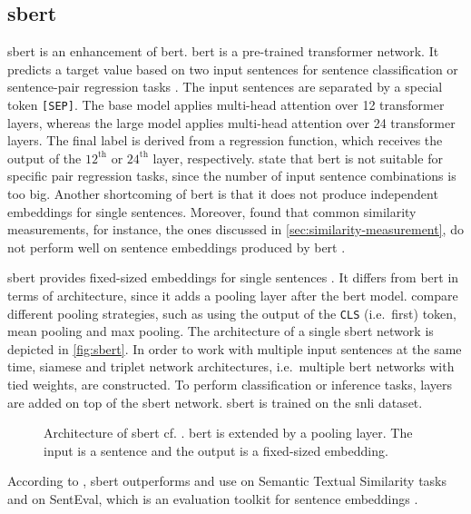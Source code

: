 \subsection{\acl*{sbert}}\label{subsec:hf-sent-ransformers}

\ac{sbert} is an enhancement of \ac{bert}.
\ac{bert} is a pre-trained transformer network.
It predicts a target value based on two input sentences for sentence classification or sentence-pair regression tasks \cite{HfsentTrans2019}.
The input sentences are separated by a special token \texttt{[SEP]}.
The base model applies multi-head attention over 12 transformer layers, whereas the large model applies multi-head attention over 24 transformer layers.
The final label is derived from a regression function, which receives the output of the $12^\text{th}$ or $24^\text{th}$ layer, respectively.
\citeauthor{HfsentTrans2019} state that \ac{bert} is not suitable for specific pair regression tasks, 
since the number of input sentence combinations is too big.
Another shortcoming of \ac{bert} is that it does not produce independent embeddings for single sentences.
Moreover, \citeauthor{HfsentTrans2019} found that common similarity measurements, for instance, the ones discussed in \autoref{sec:similarity-measurement}, 
do not perform well on sentence embeddings produced by \ac{bert} \cite{HfsentTrans2019}.

\ac{sbert} provides fixed-sized embeddings for single sentences \cite{HfsentTrans2019}.
It differs from \ac{bert} in terms of architecture, since it adds a pooling layer after the \ac{bert} model.
\citeauthor{HfsentTrans2019} compare different pooling strategies, such as using the output of the \texttt{CLS} (i.e.\ first) token, mean pooling and max pooling.
The architecture of a single \ac{sbert} network is depicted in \autoref{fig:sbert}.
In order to work with multiple input sentences at the same time, siamese and triplet network architectures, 
i.e.\ multiple \ac{bert} networks with tied weights, are constructed.
To perform classification or inference tasks, layers are added on top of the \ac{sbert} network.
\ac{sbert} is trained on the \ac{snli} dataset.

\begin{figure}[!htb] %
    \centering
    
    \caption[Architecture of \acs*{sbert}]{Architecture of \acs*{sbert} cf. \cite{HfsentTrans2019}.
    \acs*{bert} is extended by a pooling layer.
    The input is a sentence and the output is a fixed-sized embedding.
    }
    \label{fig:sbert}
\end{figure}

According to \citeauthor{HfsentTrans2019}, \ac{sbert} outperforms \infersent{} and \ac{use} on Semantic Textual Similarity tasks 
and on SentEval, which is an evaluation toolkit for sentence embeddings \cite{HfsentTrans2019}.
